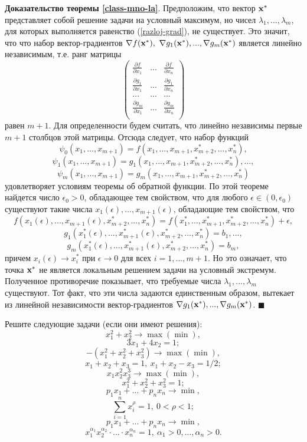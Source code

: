     \textbf{Доказательство теоремы \ref{class-mno-la}}.
    Предположим, что вектор $\mathbf{x^{*}}$ представляет собой решение задачи на условный
    максимум, но чисел $\lambda_{1},...,\lambda_{m}$, для которых
    выполняется равенство (\ref{razloj-grad}), не существует. Это значит, что что
    набор вектор-градиентов
    $\nabla f(\mathbf{x^{*}}), \ \nabla g_{1}(\mathbf{x^{*}}),...,\nabla g_{m}(\mathbf{x^{*}})$
    является линейно независимым, т.е. ранг матрицы
    \[\left(
        \begin{array}{ccc}
\frac{\partial f}{\partial x_{1}} & ... & \frac{\partial f}{\partial x_{n}} \\
\frac{\partial g_{1}}{\partial x_{1}} & ... & \frac{\partial g_{1}}{\partial x_{n}} \\
... & ... & ... \\
\frac{\partial g_{m}}{\partial x_{1}} & ... & \frac{\partial g_{m}}{\partial x_{n}} \\
        \end{array}
      \right)
\]
    равен $m+1$. Для определенности будем считать, что линейно независимы
    первые $m+1$ столбцов этой матрицы. Отсюда следует, что набор
    функций
\[\psi_{0}(x_{1},...,x_{m+1})=f(x_{1},...,x_{m+1},x^{*}_{m+2},...,x^{*}_{n}),\]
\[\psi_{1}(x_{1},...,x_{m+1})=g_{1}(x_{1},...,x_{m+1},x^{*}_{m+2},...,x^{*}_{n}),...,\]
\[\psi_{m}(x_{1},...,x_{m+1})=g_{m}(x_{1},...,x_{m+1},x^{*}_{m+2},...,x^{*}_{n})\]
    удовлетворяет условиям теоремы об обратной функции. По этой
    теореме найдется число $\epsilon_{0}>0$, обладающее тем
    свойством, что для любого $\epsilon\in(0,\epsilon_{0})$
    существуют такие числа $x_{1}(\epsilon), ...,
    x_{m+1}(\epsilon)$, обладающие тем свойством, что
\[f(x_{1}(\epsilon),...,x_{m+1}(\epsilon),x^{*}_{m+2},...,x^{*}_{n})=
f(x^{*}_{1},...,x^{*}_{m+1},x^{*}_{m+2},...,x^{*}_{n})+\epsilon,\]
\[g_{1}(x^{*}_{1}(\epsilon),...,x^{*}_{m+1}(\epsilon),x^{*}_{m+2},...,x^{*}_{n})=b_{1},...,\]
\[g_{m}(x^{*}_{1}(\epsilon),...,x^{*}_{m+1}(\epsilon),x^{*}_{m+2},...,x^{*}_{n})=b_{m},\]
    причем $x_{i}(\epsilon)\rightarrow x^{*}_{i}$ при
$\epsilon\rightarrow 0$ для всех $i=1,...,m+1$. Но это означает, что
    точка $\mathbf{x^{*}}$ не является локальным решением задачи на
    условный экстремум. Полученное противоречие показывает, что требуемые числа
    $\lambda_{1},...,\lambda_{m}$ существуют. Тот факт, что эти числа
    задаются единственным образом, вытекает из линейной независимости вектор-градиентов
    $\nabla g_{1}(\mathbf{x^{*}}),...,\nabla g_{m}(\mathbf{x^{*}})$. $\blacksquare$


\begin{exer}
    Решите следующие задачи (если они имеют решения):
    \[x_{1}^{2}+x_{2}^{2}\rightarrow\max(\min),\]
    \[ 3x_{1}+4x_{2}=1;\]
    \[-(x_{1}^{2}+x_{2}^{2}+x_{3}^{2})\rightarrow\max(\min),\]
    \[ x_{1}+x_{2}+x_{3}=1, \ x_{1}+x_{2}-x_{3}=1/2;\]
    \[x_{1}x_{2}^{2}x_{3}^{3}\rightarrow\max(\min),\]
    \[ x_{1}^{2}+x_{2}^{2}+x_{3}^{2}=1;\]
    \[p_{1}x_{1}+...+p_{n}x_{n}\rightarrow\min,\]
    \[\sum_{i=1}^{n}x_{i}^{\rho}=1, \ 0<\rho<1;\]
    \[p_{1}x_{1}+...+p_{n}x_{n}\rightarrow\min,\]
    \[x_{1}^{\alpha_{1}}x_{2}^{\alpha_{2}}\cdot...\cdot x_{n}^{\alpha_{n}}=1, \
    \alpha_{1}>0, ..., \alpha_{n}>0.\]
\end{exer}


